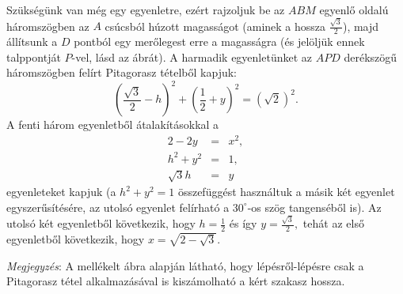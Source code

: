 \documentclass[a4paper,10pt]{article}
\begin{document}
    Szükségünk van még egy egyenletre, ezért rajzoljuk be az $ABM$ egyenlő oldalú
    háromszögben az $A$ csúcsból húzott magasságot (aminek a hossza $\frac{\sqrt{3}}{2}$),
     majd állítsunk a $D$ pontból egy merőlegest erre a magasságra (és jelöljük
     ennek talppontját $P$-vel, lásd az ábrát). A harmadik egyenletünket az $APD$
     derékszögű háromszögben felírt Pitagorasz tételből kapjuk:
    \begin{equation}\label{eq:6}
        \left( \frac{\sqrt{3}}{2} -h \right)^2 + \left( \frac{1}{2} + y \right)^2 = (\sqrt{2})^2.
    \end{equation}
    A fenti három egyenletből átalakításokkal a
    \begin{eqnarray*}
        2 - 2y &=&x^2,\\
        h^2 + y^2 &=&1,\\
        \sqrt3 h &=& y
    \end{eqnarray*}
    egyenleteket kapjuk (a $h^2+y^2=1$ összefüggést használtuk a másik két egyenlet egy\-sze\-rű\-sí\-té\-sé\-re, az utolsó egyenlet
    felírható a $30^{\circ}$-os szög tangenséből is).
    Az utolsó két egyenletből következik, hogy
    $h=\frac 12$ és így $y=\frac{\sqrt{3}}{2},$ tehát az első egyenletből következik, hogy
    $x=\sqrt{2-\sqrt{3}}.$

\medskip

\textit{Megjegyzés}: A mellékelt ábra alapján látható, hogy
lépésről-lépésre csak a Pitagorasz tétel
alkalmazásával is kiszámolható a kért szakasz hossza.
\end{document}

